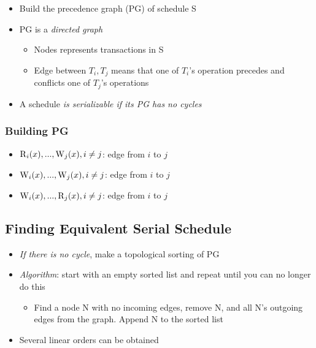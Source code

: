     \begin{itemize}
      \item Build the precedence graph (PG) of schedule S
      \item PG is a \emph{directed graph}
      \begin{itemize}
        \item Nodes represents transactions in S
        \item Edge between $ T_{i}, T_{j} $ means that one of $ T_{i} $'s
        operation precedes and conflicts one of $ T_{j} $'s operations
      \end{itemize}

      \item A schedule \emph{is serializable if its PG has no cycles}
    \end{itemize}

    \subsubsection{Building PG}

      \begin{itemize}
        \item $ \operatorname{R}_{i} (x), ..., \operatorname{W}_{j} (x), i \ne j $: edge from $ i $ to $ j $
        \item $ \operatorname{W}_{i} (x), ..., \operatorname{W}_{j} (x), i \ne j $: edge from $ i $ to $ j $
        \item $ \operatorname{W}_{i} (x), ..., \operatorname{R}_{j} (x), i \ne j $: edge from $ i $ to $ j $
      \end{itemize}

  \subsection{Finding Equivalent Serial Schedule}

    \begin{itemize}
      \item \emph{If there is no cycle}, make a topological sorting of PG
      \item \emph{Algorithm}: start with an empty sorted list and repeat
      until you can no longer do this
      \begin{itemize}
        \item Find a node N with no incoming edges, remove N, and all N's
        outgoing edges from the graph. Append N to the sorted list
      \end{itemize}

      \item Several linear orders can be obtained
    \end{itemize}

